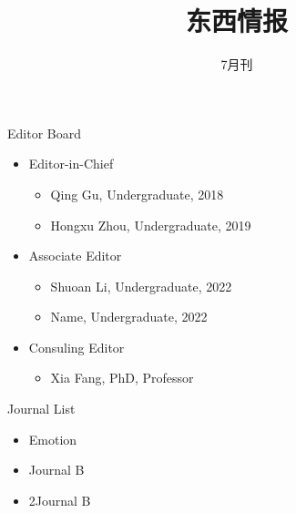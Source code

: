 \documentclass{eclab-beamer}
\title{\sffamily 东西情报}
\subtitle{\sffamily 7月刊}
\begin{document}
\begin{frame}
  \titlepage
\end{frame}

\begin{frame}{\sffamily Editor Board}

  \begin{itemize}

    \item \sffamily Editor-in-Chief

      \begin{itemize}

\item Qing Gu, Undergraduate, 2018
\item Hongxu Zhou, Undergraduate, 2019

      \end{itemize}

    \item \sffamily Associate Editor

      \begin{itemize}

\item Shuoan Li, Undergraduate, 2022
\item Name, Undergraduate, 2022

      \end{itemize}

    \item \sffamily Consuling Editor
      \begin{itemize}
        \item \sffamily Xia Fang, PhD, Professor
      \end{itemize}

  \end{itemize}

\end{frame}

\begin{frame}[allowframebreaks]{\sffamily Journal List}
  \begin{itemize}\centering

\item Emotion
\item Journal B
\item 2Journal B

  \end{itemize}
\end{frame}
\end{document}
